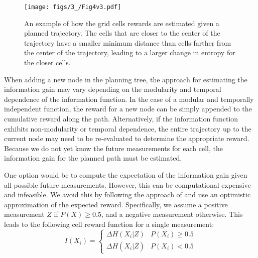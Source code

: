 \begin{figure}[t]
\centering
\texttt{[image: figs/3\_/Fig4v3.pdf]}
\caption{An example of how the grid cells rewards are estimated given a planned trajectory. The cells that are closer to the center of the trajectory have a smaller minimum distance than cells farther from the center of the trajectory, leading to a larger change in entropy for the closer cells. 
}
\label{fig:sensor-model}
\end{figure}
When adding a new node in the planning tree, the approach for estimating the information gain may vary depending on the modularity and temporal dependence of the information function. In the case of a modular and temporally independent function, the reward for a new node can be simply appended to the cumulative reward along the path. Alternatively, if the information function exhibits non-modularity or temporal dependence, the entire trajectory up to the current node may need to be re-evaluated to determine the appropriate reward. 
Because we do not yet know the future measurements for each cell, the information gain for the planned path must be estimated. 

One option would be to compute the expectation of the information gain given all possible future measurements. However, this can be computational expensive and infeasible. We avoid this by following the approach of \cite{hollinger_long-horizon_2015,moon2022tigris} and use an optimistic approximation of the expected reward. Specifically, we assume a positive measurement $Z$ if $P(X) \geq 0.5$, and a negative measurement otherwise. This leads to the following cell reward function for a single measurement:
\begin{equation}
    I(X_i) = \begin{cases} \Delta H\left(X_i|Z\right) & P\left(X_i\right) \geq 0.5 \\ \Delta H\left(X_i|\overline{Z}\right) & P\left(X_i\right) < 0.5 \end{cases}
    \label{equ:reward}
\end{equation}

